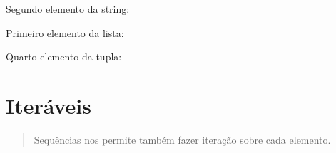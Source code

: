 \documentclass[letterpaper,10pt,brazil]{sphinxmanual}
\begin{document}
Segundo elemento da string:

\begin{sphinxVerbatim}[commandchars=\\\{\}]
\PYG{p}{[}\PYG{p}{]}
\end{sphinxVerbatim}

\begin{sphinxVerbatim}[commandchars=\\\{\}]
\end{sphinxVerbatim}

Primeiro elemento da lista:

\begin{sphinxVerbatim}[commandchars=\\\{\}]
\PYG{p}{[}       \PYG{p}{]}\PYG{p}{[}\PYG{p}{]}
\end{sphinxVerbatim}

\begin{sphinxVerbatim}[commandchars=\\\{\}]
\end{sphinxVerbatim}

Quarto elemento da tupla:

\begin{sphinxVerbatim}[commandchars=\\\{\}]
    \PYG{p}{[}\PYG{p}{]}
\end{sphinxVerbatim}

\begin{sphinxVerbatim}[commandchars=\\\{\}]
\end{sphinxVerbatim}


\section{Iteráveis}
\label{\detokenize{content/sequences:iteraveis}}\begin{quote}

Sequências nos permite também fazer iteração sobre cada elemento.
\end{quote}
\end{document}
